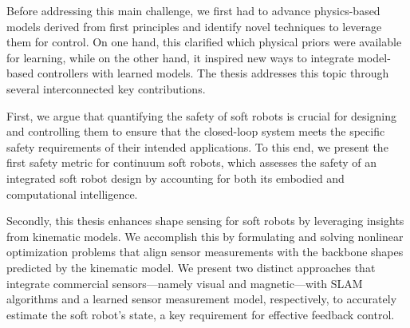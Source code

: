 Before addressing this main challenge, we first had to advance physics-based models derived from first principles and identify novel techniques to leverage them for control. On one hand, this clarified which physical priors were available for learning, while on the other hand, it inspired new ways to integrate model-based controllers with learned models.
The thesis addresses this topic through several interconnected key contributions. 

First, we argue that quantifying the safety of soft robots is crucial for designing and controlling them to ensure that the closed-loop system meets the specific safety requirements of their intended applications. To this end, we present the first safety metric for continuum soft robots, which assesses the safety of an integrated soft robot design by accounting for both its embodied and computational intelligence.

Secondly, this thesis enhances shape sensing for soft robots by leveraging insights from kinematic models. We accomplish this by formulating and solving nonlinear optimization problems that align sensor measurements with the backbone shapes predicted by the kinematic model. We present two distinct approaches that integrate commercial sensors—namely visual and magnetic—with SLAM algorithms and a learned sensor measurement model, respectively, to accurately estimate the soft robot’s state, a key requirement for effective feedback control.

